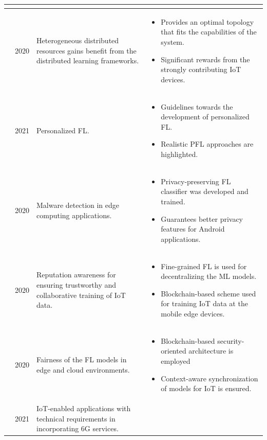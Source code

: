 \documentclass[journal]{IEEEtran}
\begin{document}
\begin{table}[!ht]
\begin{tabular}{|p{0.75cm}|p{0.5cm}|p{6.0cm}|p{9.0cm}|}
\begin{itemize}
\end{itemize}
\\ \hline
\cite{rapp2020distributed}  & 2020 & Heterogeneous distributed resources gains benefit from the distributed learning frameworks. &  
\begin{itemize}
    \item Provides an optimal topology that fits the capabilities of the system.
     \item Significant rewards from the strongly contributing IoT devices. 
\end{itemize}
\\ \hline
\cite{tan2021towards}  & 2021 & Personalized FL. &  
\begin{itemize}
    \item Guidelines towards the development of personalized FL.
    \item Realistic PFL approaches are highlighted.
\end{itemize}
\\ \hline
\cite{hsu2020privacy}  & 2020 & Malware detection in edge computing applications.  &  
\begin{itemize}
    \item Privacy-preserving FL classifier was developed and trained.
    \item Guarantees better privacy features for Android applications.
\end{itemize}
\\ \hline
\cite{ur2020towards}  & 2020 & Reputation awareness for ensuring trustworthy and collaborative training of IoT data. &  
\begin{itemize}
    \item Fine-grained FL is used for decentralizing the ML models.
    \item Blockchain-based scheme used for training IoT data at the mobile edge devices. 
\end{itemize}
\\ \hline
\cite{marulli2020security}  & 2020 & Fairness of the FL models in edge and cloud environments. &  
\begin{itemize}
    \item Blockchain-based security-oriented architecture is employed 
    \item Context-aware synchronization of models for IoT is ensured.
\end{itemize}
\\ \hline
\cite{guo2021enabling}  & 2021 & IoT-enabled applications with technical requirements in incorporating 6G services. &  

\end{tabular}
\end{table}
\end{document}
